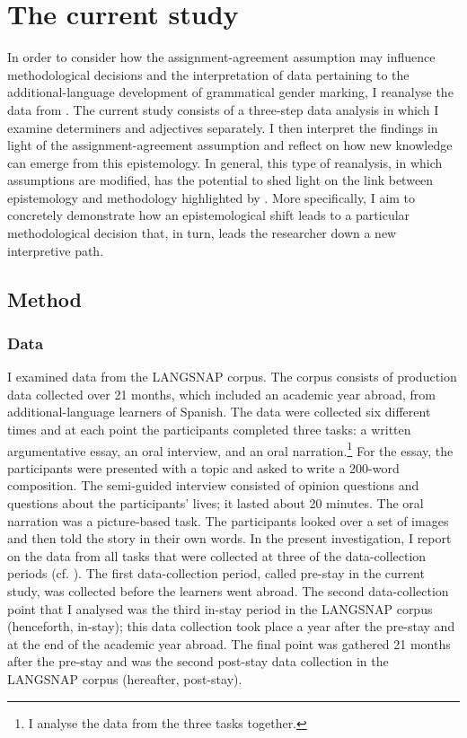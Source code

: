 \documentclass[output=paper,colorlinks,citecolor=brown,modfonts,nonflat]{../langscibook}
\begin{document}
\section{The current study}\label{sec:gudmestad:3}

In order to consider how the assignment-agreement assumption may influence methodological decisions and the interpretation of data pertaining to the ad\-di\-tion\-al-lang\-uage development of grammatical gender marking, I reanalyse the data from \citet{GudmestadEtAl2019}. The current study consists of a three-step data analysis in which I examine determiners and adjectives separately. I then interpret the findings in light of the assignment-agreement assumption and reflect on how new knowledge can emerge from this epistemology. In general, this type of reanalysis, in which assumptions are modified, has the potential to shed light on the link between epistemology and methodology highlighted by \citet{Ortega2005}. More specifically, I aim to concretely demonstrate how an epistemological shift leads to a particular methodological decision that, in turn, leads the researcher down a new interpretive path.


\subsection{Method}\label{sec:gudmestad:3.1}

\subsubsection{Data}\label{sec:gudmestad:3.1.1}

I examined data from the LANGSNAP corpus. The corpus consists of production data collected over 21 months, which included an academic year abroad, from additional-language learners of Spanish. The data were collected six different times and at each point the participants completed three tasks: a written argumentative essay, an oral interview, and an oral narration.\footnote{{I analyse the data from the three tasks together.}} For the essay, the participants were presented with a topic and asked to write a 200-word composition. The semi-guided interview consisted of opinion questions and questions about the participants’ lives; it lasted about 20 minutes. The oral narration was a picture-based task. The participants looked over a set of images and then told the story in their own words. In the present investigation, I report on the data from all tasks that were collected at three of the data-collection periods (cf. \citealt{GudmestadEtAl2019}). The first data-collection period, called pre-stay in the current study, was collected before the learners went abroad. The second data-collection point that I analysed was the third in-stay period in the LANGSNAP corpus (henceforth, in-stay); this data collection took place a year after the pre-stay and at the end of the academic year abroad. The final point was gathered 21 months after the pre-stay and was the second post-stay data collection in the LANGSNAP corpus (hereafter, post-stay).
\end{document}
